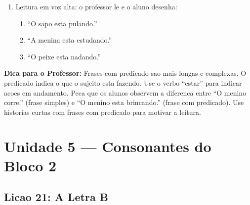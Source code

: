 \begin{exercicio}
\begin{enumerate}[resume]
  \item Leitura em voz alta: o professor le e o aluno desenha:
  \begin{enumerate}[label=\alph*)]
    \item ``O sapo esta pulando.''
    \item ``A menina esta estudando.''
    \item ``O peixe esta nadando.''
  \end{enumerate}
\end{enumerate}
\end{exercicio}

\begin{dica}
\textbf{Dica para o Professor:} Frases com predicado sao mais longas e complexas. O predicado indica o que o sujeito esta fazendo. Use o verbo ``estar'' para indicar acoes em andamento. Peca que os alunos observem a diferenca entre ``O menino corre.'' (frase simples) e ``O menino esta brincando.'' (frase com predicado). Use historias curtas com frases com predicado para motivar a leitura.
\end{dica}


\chapter{Unidade 5 --- Consonantes do Bloco 2}

\section{Licao 21: A Letra B}

\rotinasimples
{}




